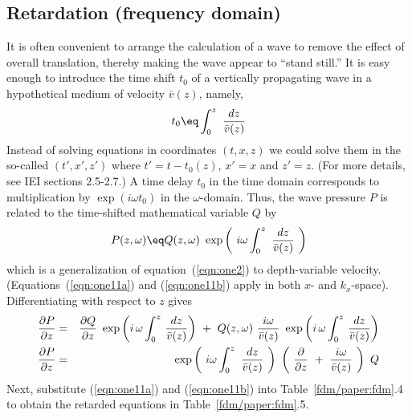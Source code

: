 {\subsection{Retardation (frequency domain)}
\par
It is often convenient to arrange the calculation of a wave
to remove the effect of overall translation,
thereby making the wave appear to ``stand still.''
It is easy enough to introduce
the time shift  $t_0$  of a vertically propagating wave
in a hypothetical medium of velocity  $ \bar v ( z )$, namely,
\begin{equation}
t_0  \eq  \int_0^z \  { dz   \over  \bar v (z) }
\label{eqn:one10}
\end{equation}
Instead of solving equations in coordinates $(t,x,z)$
we could solve them in the so-called 
$(t',x',z')$ where
$t'=t-t_0(z)$, $x'=x$ and $z'=z$.
(For more details, see IEI sections 2.5-2.7.)
A time delay  $t_0$  in
the time domain corresponds to multiplication
by  $\exp ( i \omega t_0 )$  in the  $\omega$-domain.
Thus, the wave pressure $P$  is related
to the time-shifted mathematical variable  $Q$  by
\begin{equation}
P(z, \omega )  \eq 
Q(z, \omega ) \  \exp
\left( \  i \omega \int_0^z \  {dz \over  \bar v (z)} \  \right)
\label{eqn:one11a}
\end{equation}
which is a generalization of equation~(\ref{eqn:one2})
to depth-variable velocity.
(Equations~(\ref{eqn:one11a}) and (\ref{eqn:one11b}) apply in both $x$- and
$k_x$-space).
Differentiating with respect to  $z$  gives
\begin{eqnarray}
{\partial P \over \partial z } &=& { \partial Q   \over  \partial z } \ 
\exp \left(  i\, \omega  \int_0^z \,  {dz \over  \bar v (z) }
\right) \ +\ 
Q(z, \omega ) \  { i \omega   \over  \bar v (z) }
\  \exp \left(  i\, \omega  \int_0^z \, {dz \over  \bar v (z) }  \right)
\\
{\partial P   \over \partial z}  &=&
\exp \left( \  i \omega  \int_0^z \  {dz \over  \bar v (z) } \  \right)
\  \left( \  {\partial \over \partial z} \ +\ 
{ i \omega   \over  \bar v (z) } \  \right) \  Q
\label{eqn:one11b}
\end{eqnarray}
Next, substitute (\ref{eqn:one11a}) and (\ref{eqn:one11b})
into Table~\ref{fdm/paper:fdm}.4
to obtain the retarded equations in Table~\ref{fdm/paper:fdm}.5.
\begin{table}
\begin{center}
\begin{tabular}{|r|ll|}     \hline

\end{tabular}
\end{center}
\end{table}}

